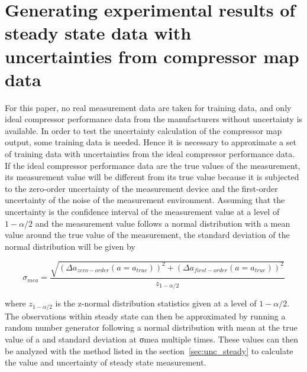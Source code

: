 \section{Generating experimental results of steady state data with uncertainties from compressor map data}
\label{sec:approx_uncertainty}
For this paper, no real measurement data are taken for training data, and only ideal compressor performance data from the manufacturers without uncertainty is available. In order to test the uncertainty calculation of the compressor map output, some training data is needed. Hence it is necessary to approximate a set of training data with uncertainties from the ideal compressor performance data. If the ideal compressor performance data are the true values of the measurement, its measurement value will be different from its true value because it is subjected to the zero-order uncertainty of the measurement device and the first-order uncertainty of the noise of the measurement environment.  Assuming that the uncertainty is the confidence interval of the measurement value at a level of $1-\alpha/2$ and the measurement value follows a normal distribution with a mean value around the true value of the measurement, the standard deviation of the normal distribution will be given by

\begin{equation}
{\sigma _{mea}} = \frac{{\sqrt {{{(\Delta {a_{zero - order}}(a = {a_{true}}))}^2} + {{(\Delta {a_{first - order}}(a = {a_{true}}))}^2}} }}{{{z_{1 - \alpha /2}}}}
\label{eq:std_norm}
\end{equation}

where $z_{1-\alpha/2}$ is the z-normal distribution statistics given at a level of ${1-\alpha/2}$. The observations within steady state can then be approximated by running a random number generator following a normal distribution with mean at the true value of a and standard deviation at σmea multiple times. These values can then be analyzed with the method listed in the section~\ref{sec:unc_steady} to calculate the value and uncertainty of steady state measurement.